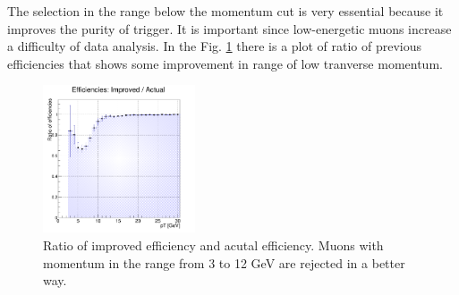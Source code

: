 The selection in the range below the momentum cut is very essential because it improves the purity of trigger.
It is important since low-energetic muons increase a difficulty of data analysis.
In the Fig. \ref{ratio} there is a plot of ratio of previous efficiencies that shows some improvement in range of low tranverse momentum.

\begin{figure}[ht]
\centering
\includegraphics[width=0.4\textwidth]{Ratio16.png}
\caption{Ratio of improved efficiency and acutal efficiency. Muons with momentum in the range from 3 to 12 GeV are rejected in a better way.}
\label{ratio}
\end{figure} 

